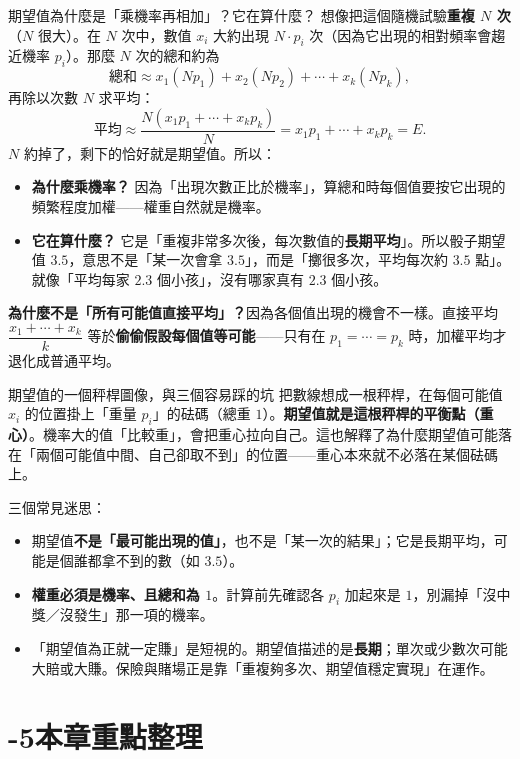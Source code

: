 \documentclass[11pt]{article}
\begin{document}
\begin{補充框}{期望值為什麼是「乘機率再相加」？它在算什麼？}
想像把這個隨機試驗\textbf{重複 $N$ 次}（$N$ 很大）。在 $N$ 次中，數值 $x_i$ 大約出現 $N\cdot p_i$ 次（因為它出現的相對頻率會趨近機率 $p_i$）。那麼 $N$ 次的總和約為
$$\text{總和}\approx x_1(Np_1)+x_2(Np_2)+\cdots+x_k(Np_k),$$
再除以次數 $N$ 求平均：
$$\text{平均}\approx\frac{N(x_1p_1+\cdots+x_kp_k)}{N}=x_1p_1+\cdots+x_kp_k=E.$$
$N$ 約掉了，剩下的恰好就是期望值。所以：
\begin{itemize}\setlength{\itemsep}{1pt}
\item \textbf{為什麼乘機率？} 因為「出現次數正比於機率」，算總和時每個值要按它出現的頻繁程度加權——權重自然就是機率。
\item \textbf{它在算什麼？} 它是「重複非常多次後，每次數值的\textbf{長期平均}」。所以骰子期望值 $3.5$，意思不是「某一次會拿 $3.5$」，而是「擲很多次，平均每次約 $3.5$ 點」。就像「平均每家 $2.3$ 個小孩」，沒有哪家真有 $2.3$ 個小孩。
\end{itemize}

\textbf{為什麼不是「所有可能值直接平均」？}因為各個值出現的機會不一樣。直接平均 $\dfrac{x_1+\cdots+x_k}{k}$ 等於\textbf{偷偷假設每個值等可能}——只有在 $p_1=\cdots=p_k$ 時，加權平均才退化成普通平均。
\end{補充框}

\begin{延伸框}{期望值的一個秤桿圖像，與三個容易踩的坑}
把數線想成一根秤桿，在每個可能值 $x_i$ 的位置掛上「重量 $p_i$」的砝碼（總重 $1$）。\textbf{期望值就是這根秤桿的平衡點（重心）}。機率大的值「比較重」，會把重心拉向自己。這也解釋了為什麼期望值可能落在「兩個可能值中間、自己卻取不到」的位置——重心本來就不必落在某個砝碼上。

三個常見迷思：
\begin{itemize}\setlength{\itemsep}{1pt}
\item 期望值\textbf{不是「最可能出現的值」}，也不是「某一次的結果」；它是長期平均，可能是個誰都拿不到的數（如 $3.5$）。
\item \textbf{權重必須是機率、且總和為 $1$}。計算前先確認各 $p_i$ 加起來是 $1$，別漏掉「沒中獎／沒發生」那一項的機率。
\item 「期望值為正就一定賺」是短視的。期望值描述的是\textbf{長期}；單次或少數次可能大賠或大賺。保險與賭場正是靠「重複夠多次、期望值穩定實現」在運作。
\end{itemize}
\end{延伸框}

\section*{-5\quad 本章重點整理}
\end{document}
